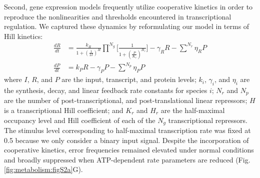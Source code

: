 Second, gene expression models frequently utilize cooperative kinetics in order to reproduce the nonlinearities and thresholds encountered in transcriptional regulation. We captured these dynamics by reformulating our model in terms of Hill kinetics:
\begin{equation}
\begin{aligned}
\label{metabolism:model:hill}
\frac{dR}{dt}&=\frac{k_{R}}{1+(\frac{1}{2I})^H}\prod^{N_g}{\Bigg[\frac{1}{1+(\frac{P}{K_{r}})^{H_{r}}}\Bigg]} -\gamma_R R - \sum^{N_r}{\eta_{R} P} \\
\frac{dP}{dt}&=k_{P}R -\gamma_P P - \sum^{N_p}{\eta_{P} P}
\end{aligned}
\end{equation}
where $I$, $R$, and $P$ are the input, transcript, and protein levels; $k_i$, $\gamma_i$, and $\eta_i$ are the synthesis, decay, and linear feedback rate constants for species $i$; $N_r$ and $N_p$ are the number of post-transcriptional, and post-translational linear repressors; $H$ is a transcriptional Hill coefficient; and $K_r$ and $H_r$ are the half-maximal occupancy level and Hill coefficient of each of the $N_g$ transcriptional repressors. The stimulus level corresponding to half-maximal transcription rate was fixed at 0.5 because we only consider a binary input signal. Despite the incorporation of cooperative kinetics, error frequencies remained elevated under normal conditions and broadly suppressed when ATP-dependent rate parameters are reduced (Fig. \ref{fig:metabolism:figS2a}G).

